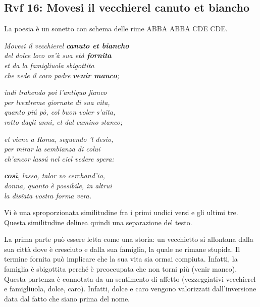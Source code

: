 \documentclass[a4paper]{article}
\begin{document}
\pagebreak

\subsection{Rvf 16: Movesi il vecchierel canuto et biancho}

La poesia è un sonetto con schema delle rime ABBA ABBA CDE CDE.

\begin{center}
    \textit{Movesi il vecchierel \textbf{canuto et biancho}} \\
    \textit{del dolce loco ov'à sua età \textbf{fornita}} \\
    \textit{et da la famigliuola sbigottita} \\
    \textit{che vede il caro padre \textbf{venir manco};}
\end{center}
\begin{center}
    \textit{indi trahendo poi l'antiquo fianco} \\
    \textit{per lvextreme giornate di sua vita,} \\
    \textit{quanto piú pò, col buon voler s'aita,} \\
    \textit{rotto dagli anni, et dal camino stanco;}
\end{center}
\begin{center}
    \textit{et viene a Roma, seguendo 'l desio,} \\
    \textit{per mirar la sembianza di colui} \\
    \textit{ch'ancor lassú nel ciel vedere spera:}
\end{center}
\begin{center}
    \textit{\textbf{così}, lasso, talor vo cerchand'io,} \\
    \textit{donna, quanto è possibile, in altrui} \\
    \textit{la disïata vostra forma vera.}
\end{center}

Vi è una sproporzionata similitudine fra i primi undici versi e gli ultimi tre.
Questa similitudine delinea quindi una separazione del testo.

La prima parte può essere letta come una storia: un vecchietto si allontana
dalla sua città dove è cresciuto e dalla sua famiglia, la quale ne rimane stupida.
Il termine fornita può implicare che la sua vita sia ormai compiuta.
Infatti, la famiglia è sbigottita perché è preoccupata che non torni più (venir manco).
Questa partenza è connotata da un sentimento di affetto (vezzeggiativi vecchierel e famigliuola, dolce, caro).
Infatti, dolce e caro vengono valorizzati dall'inversione data dal fatto che siano prima del nome.
\end{document}
